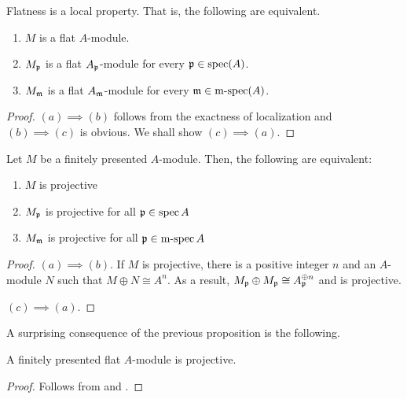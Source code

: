 \begin{proposition}
    Flatness is a local property. That is, the following are equivalent.
    \begin{enumerate}[label=(\alph*)]
        \item $M$ is a flat $A$-module. 
        \item $M_\mathfrak p$ is a flat $A_\mathfrak p$-module for every $\mathfrak p\in\operatorname{spec}(A)$. 
        \item $M_\mathfrak m$ is a flat $A_\mathfrak m$-module for every $\mathfrak m\in\operatorname{m-spec}(A)$.
    \end{enumerate}
\end{proposition}
\begin{proof}
    $(a)\implies(b)$ follows from the exactness of localization and $(b)\implies(c)$ is obvious. We shall show $(c)\implies(a)$.
\end{proof}

\begin{proposition}
    Let $M$ be a finitely presented $A$-module. Then, the following are equivalent: 
    \begin{enumerate}[label=(\alph*)]
        \item $M$ is projective
        \item $M_\mathfrak p$ is projective for all $\mathfrak p\in\operatorname{spec} A$ 
        \item $M_\mathfrak m$ is projective for all $\mathfrak p\in\operatorname{m-spec} A$ 
    \end{enumerate}
\end{proposition}
\begin{proof}
    $(a)\implies(b)$. If $M$ is projective, there is a positive integer $n$ and an $A$-module $N$ such that $M\oplus N\cong A^n$. As a result, $M_\mathfrak p\oplus M_\mathfrak p\cong A_\mathfrak p^{\oplus n}$ and is projective. 

    $(c)\implies(a)$. 
\end{proof}

A surprising consequence of the previous proposition is the following. 
\begin{proposition}
    A finitely presented flat $A$-module is projective.
\end{proposition}
\begin{proof}
    Follows from  and .
\end{proof}

